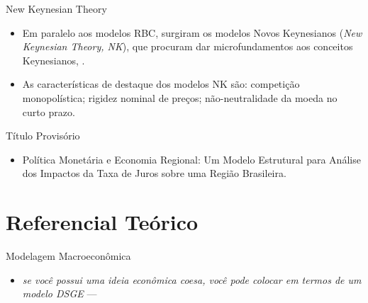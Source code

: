 \documentclass[10pt]{beamer}
\let\olditem\item
\renewcommand{\item}{%
	\olditem\vspace{5pt}}
\begin{document}

\begin{frame}{New Keynesian Theory}
	
	\begin{itemize}
		\item Em paralelo aos modelos RBC, surgiram os modelos Novos Keynesianos (\textit{New Keynesian Theory, NK}), que procuram dar microfundamentos aos conceitos Keynesianos, \textcite[p.26]{gali_macroeconomic_2007}.
		\item As características de destaque dos modelos NK são: competição monopolística; rigidez nominal de preços; não-neutralidade da moeda no curto prazo.
	\end{itemize}
	
\end{frame}

	
\begin{frame}[fragile]{Título Provisório}

	\begin{itemize}
		\item Política Monetária e Economia Regional: Um Modelo Estrutural para Análise dos Impactos da Taxa de Juros sobre uma Região Brasileira.
	\end{itemize}
		
\end{frame}
	
	
\section{Referencial Teórico}
	

\begin{frame}[fragile]{Modelagem Macroeconômica}
	
	\begin{itemize}
		\item \textit{se você possui uma ideia econômica coesa, você pode colocar em termos de um modelo DSGE} --- \textcite{solis-garcia_ucb_2022}
	\end{itemize}
	
\end{frame}
\end{document}
